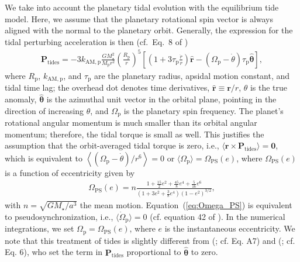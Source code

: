 \documentclass[iop,usenatbib]{emulateapj}
\newcommand{\ve}[1]{\boldsymbol{#1}}
\newcommand{\unit}[1]{\hat{\boldsymbol{#1}}}
\begin{document}
We take into account the planetary tidal evolution with the equilibrium tide model. Here, we assume that the planetary rotational spin vector is always aligned with the normal to the planetary orbit. Generally, the expression for the tidal perturbing acceleration is then (cf.\ Eq.\ 8 of \citealt{1981A&A....99..126H})
\begin{align}
\label{eq:P_tides}
\ve{P}_\mathrm{tides} = - 3 k_\mathrm{AM,p} \frac{ G M_\star^2}{M_\mathrm{p} r^2} \left ( \frac{R_\mathrm{p}}{r} \right )^5 \left [ \left ( 1 + 3 \tau_\mathrm{p} \frac{\dot{r}}{r} \right ) \unit{r} - \left ( \Omega_\mathrm{p} - \dot{\theta} \right ) \tau_\mathrm{p} \unit{\theta} \right ],
\end{align}
where $R_\mathrm{p}$, $k_\mathrm{AM,p}$, and $\tau_\mathrm{p}$ are the planetary radius, apsidal motion constant, and tidal time lag; the overhead dot denotes time derivatives, $\unit{r}\equiv \ve{r}/r$, $\theta$ is the true anomaly, $\unit{\theta}$ is the azimuthal unit vector in the orbital plane, pointing in the direction of increasing $\theta$, and $\Omega_\mathrm{p}$ is the planetary spin frequency. The planet's rotational angular momentum is much smaller than its orbital angular momentum; therefore, the tidal torque is small as well. This justifies the assumption that the orbit-averaged tidal torque is zero, i.e., $\langle \ve{r} \times \ve{P}_\mathrm{tides} \rangle = \ve{0}$, which is equivalent to $\left \langle (\Omega_\mathrm{p} - \dot{\theta})/r^6 \right \rangle = 0$ or $\langle \Omega_\mathrm{p} \rangle = \Omega_\mathrm{PS}(e)$, where $\Omega_\mathrm{PS}(e)$ is a function of eccentricity given by
\begin{align}
\label{eq:Omega_PS}
\Omega_\mathrm{PS}(e) = n \frac{1 + \frac{15}{2} e^2 + \frac{45}{8} e^4 + \frac{5}{16} e^6}{ \left ( 1+3e^2+\frac{3}{8} e^4\right ) \left (1-e^2 \right )^{3/2}},
\end{align}
with $n=\sqrt{G M_\star/a^3}$ the mean motion. Equation~(\ref{eq:Omega_PS}) is equivalent to pseudosynchronization, i.e., $\langle \dot{\Omega}_\mathrm{p} \rangle=0$ (cf. equation 42 of \citealt{1981A&A....99..126H}). In the numerical integrations, we set $\Omega_\mathrm{p} = \Omega_\mathrm{PS}(e)$, where $e$ is the instantaneous eccentricity. We note that this treatment of tides is slightly different from \citeauthor{2011ApJ...735..109W} (\citeyear{2011ApJ...735..109W}; cf. Eq. A7) and \citeauthor{2016AJ....152..174A} (\citeyear{2016AJ....152..174A}; cf. Eq. 6), who set the term in $\ve{P}_\mathrm{tides}$ proportional to $\unit{\theta}$ to zero. 
\end{document}
